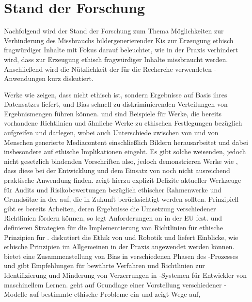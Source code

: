 \chapter{Stand der Forschung}

Nachfolgend wird der Stand der Forschung zum Thema Möglichkeiten zur Verhinderung 
des Missbrauchs bildergenerierender Kis zur Erzeugung ethisch fragwürdiger Inhalte mit Fokus darauf beleuchtet, wie in der Praxis verhindert wird, dass  zur Erzeugung ethisch fragwürdiger Inhalte missbraucht werden. Anschließend wird die Nützlichkeit der für die Recherche verwendeten -Anwendungen kurz diskutiert.

Werke wie \cite{Salminen} zeigen, dass  nicht ethisch ist, sondern Ergebnisse auf Basis ihres Datensatzes liefert,
und Bias schnell zu diskriminierenden Verteilungen von Ergebnismengen führen können. \cite{Jobin} und \cite{Partadiredja}
sind Beispiele für Werke, die bereits vorhandene Richtlinien und ähnliche Werke zu ethischen Festlegungen bezüglich  
aufgreifen und darlegen, wobei \cite{Partadiredja} auch Unterschiede zwischen von  und von Menschen generierte 
Mediacontent einschließlich Bildern herausarbeitet und dabei insbesondere auf ethische Implikationen eingeht. 
Es gibt solche weisenden, jedoch nicht gesetzlich bindenden Vorschriften also, jedoch demonstrieren Werke wie 
\cite{Ayling}, dass diese bei der Entwicklung und dem Einsatz von  noch nicht ausreichend praktische Anwendung 
finden. \cite{Ayling} zeigt hierzu explizit Defizite aktueller Werkzeuge für Audits und Risikobewertungen bezüglich 
ethischer Rahmenwerke und Grundsätze in der  auf, die in Zukunft berücksichtigt werden sollten. 
Prinzipiell gibt es bereits Arbeiten, deren Ergebnisse die Umsetzung verschiedener Richtlinien fördern können, so legt 
\cite{EUCommision} Anforderungen an  in der EU fest. \cite{Jobin} und \cite{Hagendorff} definieren Strategien 
für die Implementierung von Richtlinien für ethische Prinzipien für . \cite{Stahl} diskutiert die Ethik von  und Robotik 
und liefert Einblicke, wie ethische Prinzipien im Allgemeinen in der Praxis angewendet werden können. \cite{Srinivasan} bietet 
eine Zusammenstellung von Bias in verschiedenen Phasen des -Prozesses und gibt Empfehlungen für bewährte Verfahren und 
Richtlinien zur Identifizierung und Minderung von Verzerrungen in -Systemen für Entwickler von maschinellem Lernen. \cite{Jameel} 
geht auf Grundlage einer Vorstellung verschiedener -Modelle auf bestimmte ethische Probleme ein und zeigt Wege auf, 
